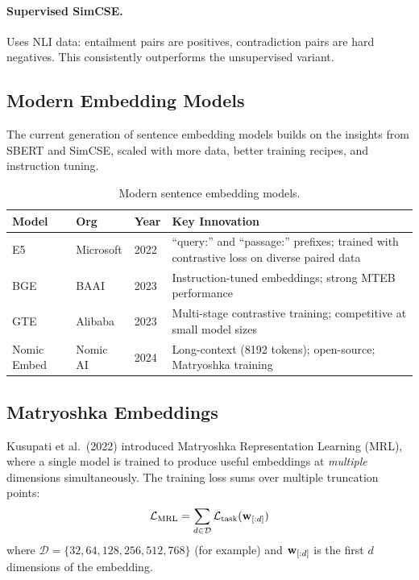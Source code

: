 \paragraph{Supervised SimCSE.}
Uses NLI data: entailment pairs are positives, contradiction pairs are hard
negatives.  This consistently outperforms the unsupervised variant.

\subsection{Modern Embedding Models}

The current generation of sentence embedding models builds on the insights
from SBERT and SimCSE, scaled with more data, better training recipes, and
instruction tuning.

\begin{table}[H]
\centering
\caption{Modern sentence embedding models.}
\label{tab:modern_embeddings}
\begin{tabularx}{\textwidth}{l l l X}
\toprule
\textbf{Model} & \textbf{Org} & \textbf{Year} & \textbf{Key Innovation} \\
\midrule
E5 & Microsoft & 2022 & ``query:'' and ``passage:'' prefixes; trained
    with contrastive loss on diverse paired data \\
BGE & BAAI & 2023 & Instruction-tuned embeddings; strong MTEB
    performance \\
GTE & Alibaba & 2023 & Multi-stage contrastive training; competitive
    at small model sizes \\
Nomic Embed & Nomic AI & 2024 & Long-context (8192 tokens); open-source;
    Matryoshka training \\
\bottomrule
\end{tabularx}
\end{table}

\subsection{Matryoshka Embeddings}

Kusupati et al.\ (2022) introduced Matryoshka Representation Learning (MRL),
where a single model is trained to produce useful embeddings at \emph{multiple}
dimensions simultaneously.  The training loss sums over multiple truncation
points:
\[
    \mathcal{L}_{\text{MRL}} = \sum_{d \in \mathcal{D}}
                         \mathcal{L}_{\text{task}}(\mathbf{w}_{[:d]})
\]
where $\mathcal{D} = \{32, 64, 128, 256, 512, 768\}$ (for example) and
$\mathbf{w}_{[:d]}$ is the first $d$ dimensions of the embedding.

